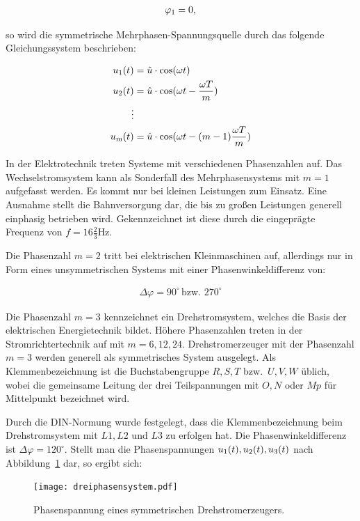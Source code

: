 \begin{align*}
\varphi_{\mathrm{1}} = 0,
\end{align*}

so wird die symmetrische Mehrphasen-Spannungsquelle durch das folgende Gleichungssystem beschrieben:

\begin{align}
u_{\mathrm{1}}(t) &= \hat{u} \cdot \cos(\omega t) \label{eqn:drehstrom} \\ 
u_{\mathrm{2}}(t) &= \hat{u} \cdot \cos(\omega t - \frac{\omega T}{m})\nonumber \\
\vdots \nonumber \\
u_{\mathrm{m}}(t) &= \hat{u} \cdot \cos(\omega t - (m-1)\frac{\omega T}{m})\nonumber
\end{align}

In der Elektrotechnik treten Systeme mit verschiedenen Phasenzahlen auf.
Das Wechselstromsystem kann als Sonderfall des Mehrphasensystems mit $m=1$ aufgefasst werden.
Es kommt nur bei kleinen Leistungen zum Einsatz.
Eine Ausnahme stellt die Bahnversorgung dar, die bis zu großen Leistungen generell einphasig betrieben wird.
Gekennzeichnet ist diese durch die eingeprägte Frequenz von $f = 16\frac{2}{3}\mbox{Hz}$.

Die Phasenzahl $m=2$ tritt bei elektrischen Kleinmaschinen auf, allerdings nur in Form eines unsymmetrischen Systems mit einer Phasenwinkeldifferenz von:

\begin{align*}
\Delta \varphi = 90^{\circ} \,\text{bzw.\ } 270^{\circ}
\end{align*}

Die Phasenzahl $m=3$ kennzeichnet ein Drehstromsystem, welches die Basis der elektrischen Energietechnik bildet.
Höhere Phasenzahlen treten \zB in der Stromrichtertechnik auf mit $m=6, 12, 24$.
Drehstromerzeuger mit der Phasenzahl $m=3$ werden generell als symmetrisches System ausgelegt.
Als Klemmenbezeichnung ist die Buchstabengruppe $R, S, T$ bzw.\ $U, V, W$ üblich, wobei die gemeinsame Leitung der drei Teilspannungen mit $O, N$ oder $Mp$ für Mittelpunkt bezeichnet wird.

Durch die DIN-Normung wurde festgelegt, dass die Klemmenbezeichnung beim Drehstromsystem mit $L1, L2$ und $L3$ zu erfolgen hat.
Die Phasenwinkeldifferenz ist $\Delta \varphi = 120^{\circ}$.
Stellt man die Phasenspannungen $u_{\mathrm{1}}(t), u_{\mathrm{2}}(t), u_{\mathrm{3}}(t)$ nach Abbildung~\ref{fig:dreiphasen} dar, so ergibt sich:

\begin{figure}[!h]
\centering
\texttt{[image: dreiphasensystem.pdf]}
\label{fig:dreiphasen}
\caption{Phasenspannung eines symmetrischen Drehstromerzeugers.}
\end{figure}

